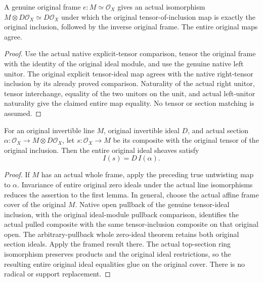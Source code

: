 \begin{lemma}
\label{lem:kn-nadel-auxiliary-tensor-inclusion-untwist}
\leanok
{}
A genuine original frame $e:M\simeq\mathcal O_X$ gives an actual
isomorphism $M\otimes D\mathcal O_X\simeq D\mathcal O_X$ under which
the original tensor-of-inclusion map is exactly the original inclusion,
followed by the inverse original frame. The entire original maps agree.
\end{lemma}
\begin{proof}
Use the actual native explicit-tensor comparison, tensor the original
frame with the identity of the original ideal module, and use the genuine
native left unitor. The original explicit tensor-ideal map agrees with
the native right-tensor inclusion by its already proved comparison.
Naturality of the actual right unitor, tensor interchange, equality of
the two unitors on the unit, and actual left-unitor naturality give the
claimed entire map equality. No tensor or section matching is assumed.
\end{proof}

\begin{theorem}
\label{thm:kn-nadel-auxiliary-whole-branch-product}
\leanok
{}
For an original invertible line $M$, original invertible ideal $D$, and
actual section $\alpha:\mathcal O_X\to M\otimes D\mathcal O_X$, let
$s:\mathcal O_X\to M$ be its composite with the original tensor of the
original inclusion. Then the entire original ideal sheaves satisfy
\[
 I(s)=D\,I(\alpha).
\]
\end{theorem}
\begin{proof}
If $M$ has an actual whole frame, apply the preceding true untwisting map
to $\alpha$. Invariance of entire original zero ideals under the actual
line isomorphisms reduces the assertion to the first lemma. In general,
choose the actual affine frame cover of the original $M$. Native open
pullback of the genuine tensor-ideal inclusion, with the original
ideal-module pullback comparison, identifies the actual pulled composite
with the same tensor-inclusion composite on that original open. The
arbitrary-pullback whole zero-ideal theorem retains both original section
ideals. Apply the framed result there. The actual top-section ring
isomorphism preserves products and the original ideal restrictions, so
the resulting entire original ideal equalities glue on the original
cover. There is no radical or support replacement.
\end{proof}

